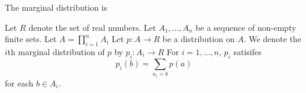
\sbasic















\sstart
{}



The marginal distribution is


Let $R$ denote the set of
real numbers.
Let $A_1, \dots, A_n$ be
a sequence of non-empty finite
sets.
Let $A = \prod_{i = 1}^{n} A_i$
Let $p: A \to R$ be a distribution
on $A$.
We denote the $i$th marginal
distribution of $p$ by $p_i: A_i \to R$
For $i = 1, \dots, n$,
$p_i$ satisifes
\[
  p_i(b) = \sum_{a_i = b} p(a)
\]
for each $b \in A_i$.
\strats
